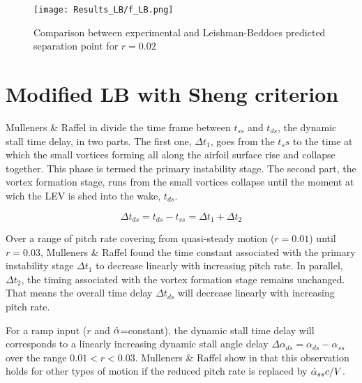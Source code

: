 \begin{figure}[h]
    \centering
    \texttt{[image: Results\_LB/f\_LB.png]}
    \caption{Comparison between experimental and Leishman-Beddoes predicted separation point for $r = 0.02$}
    \label{fig:f_LB}
\end{figure}

\section{Modified LB with Sheng criterion}

Mulleners \& Raffel in \cite{mulleners_onset_2010} divide the time frame between $t_{ss}$ and $t_{ds}$, the dynamic stall time delay, in two parts. The first one, $\Delta t_1$, goes from the $t_ss$ to the time at which the small vortices forming all along the airfoil surface rise and collapse together. This phase is termed the primary instability stage. The second part, the vortex formation stage, runs from the small vortices collapse until the moment at wich the LEV is shed into the wake, $t_{ds}$.

\begin{equation}
\Delta t_{ds} = t_{ds} - t_{ss}  = \Delta t_1 + \Delta t_2
\end{equation}

Over a range of pitch rate covering from quasi-steady motion ($r=0.01$) until $r=0.03$, Mulleners \& Raffel \cite{mulleners_onset_2010,mulleners_onset_2012,mulleners_dynamic_2013} found the time constant associated with the primary instability stage $\Delta t_1$ to decrease linearly with increasing pitch rate. In parallel, $\Delta t_2$, the timing associated with the vortex formation stage remains unchanged. That means the overall time delay $\Delta t_{ds}$ will decrease linearly with increasing pitch rate. 

For a ramp input ($r$ and $\dot{\alpha}$=constant), the dynamic stall time delay will corresponds to a linearly increasing dynamic stall angle delay $\Delta \alpha_{ds} = \alpha_{ds} - \alpha_{ss}$ over the range $0.01<r<0.03$. Mulleners \& Raffel show in \cite{mulleners_onset_2012} that this observation holds for other types of motion if the reduced pitch rate is replaced by $\dot{\alpha}_{ss} c /V$.

